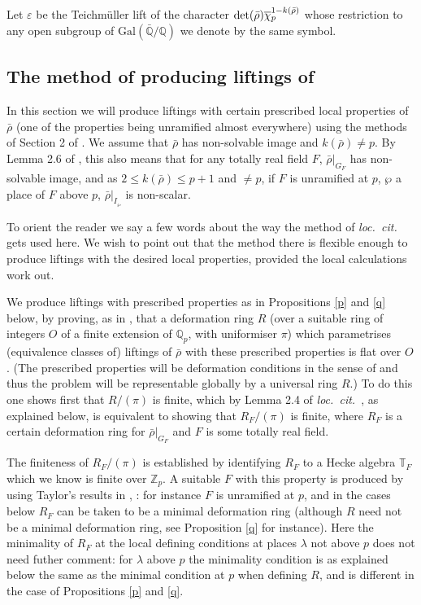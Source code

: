 \documentclass[12pt]{amsart}
\newcommand{\T}{\mathbb{T}}
\newcommand{\Q}{\mathbb{Q}}
\newcommand{\Z}{\mathbb{Z}}
\newcommand{\rhobar}{\overline{\rho}}
\def\rhobar{ {\bar {\rho} } }
\def\rhob{ {\bar {\rho} } }
\newcommand{\Galois}{\mathrm{Gal}}
\newcommand{\Gal}{\Galois( \bar{ {\mathbb Q}}/{\mathbb Q})}
\newcommand{\vep}{{\varepsilon}}
\begin{document}
Let $\vep$ be the Teichm\"uller lift of the  character 
${\rm det}(\rhob)\overline \chi_p^{1-k(\rhob)}$ whose restriction to any open subgroup of $\Gal$ we denote by the same symbol. 


\subsection{The method of producing liftings of \cite{KW}}\label{liftings}

In this section we will produce liftings with certain prescribed local properties
of $\rhobar$ (one of the properties being unramified almost everywhere) using the methods of Section 2 of \cite{KW}. We assume 
that $\rhobar$ has non-solvable image and $k(\rhobar) \neq p$.
By Lemma 2.6 of \cite{KW}, this also means that for any totally real field $F$,
 $\rhobar|_{G_F}$ has non-solvable image, and as $2 \leq k(\rhobar) \leq p+1$ and $\neq p$,  if $F$ is unramified at $p$, 
$\wp$ a place of $F$ above $p$, $\rhobar|_{I_{\wp}}$ is non-scalar.


To orient the reader we say a few words about 
the way the method of {\it loc.\ cit.\ } gets used here. We wish to point out that the method there is flexible enough to produce liftings with the desired local properties, provided the local calculations work out.

We 
produce liftings
with  prescribed properties as in Propositions \ref{p} and \ref{q} below, 
by proving, as in \cite{KW},
that a deformation ring $R$ (over a suitable ring of integers $O$ of a finite extension of $\Q_p$, with uniformiser $\pi$)  which parametrises (equivalence classes of) liftings of $\rhobar$
with these prescribed properties is flat 
over $O$. (The prescribed properties will be deformation conditions in the sense of \cite{Mazur} and thus the problem will be representable globally by a 
universal ring $R$.) To do this one shows first that $R/(\pi)$ is finite, which
by Lemma 2.4 of {\it loc.\ cit.\ }, as explained below,
is equivalent to showing that $R_F/(\pi)$ is finite, where $R_F$ is
a certain deformation ring for $\rhobar|_{G_F}$ and $F$ is some totally real
field. 

The finiteness of $R_F/(\pi)$ is established by identifying $R_F$ to
a Hecke algebra $\T_F$ which we know is finite over $\Z_p$. 
A suitable $F$ with this property is produced by using Taylor's results
in \cite{Tay1}, \cite{Tay2}: for instance $F$ is unramified at $p$, and in the cases below $R_F$ can be taken to be a minimal deformation ring (although $R$ need not be a minimal deformation ring, see Proposition \ref{q} for instance).
Here the minimality of $R_F$ at the local defining conditions at 
places $\lambda$ not above $p$ does not need futher comment: for $\lambda$ above $p$ the minimality condition is as explained below the same as the minimal condition at $p$ when defining $R$, and is different in the case
of Propositions \ref{p} and \ref{q}.
\end{document}
